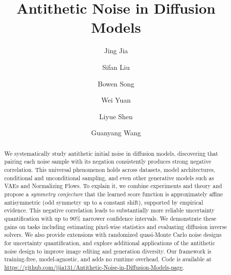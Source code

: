\documentclass[12pt]{article}
\newcommand{\0}{\mathbf{0}}
\begin{document}
\title{Antithetic Noise in Diffusion Models}
\author[1]{Jing Jia}
\author[2]{Sifan Liu \protect\footnotemark[1]}
\author[3]{Bowen Song}
\author[4]{Wei Yuan}   
\author[3]{Liyue Shen \protect\footnotemark[1]}
\author[4]{Guanyang Wang \protect\footnotemark[1]}


\maketitle

\begingroup
  \makeatletter
    \renewcommand*{\thefootnote}{\fnsymbol{footnote}}
    \setcounter{footnote}{1}
  \makeatother
\endgroup
\begin{abstract}
We systematically study antithetic initial noise in diffusion models, discovering that pairing each noise sample with its negation consistently produces strong negative correlation. This universal phenomenon holds across datasets, model architectures, conditional and unconditional sampling, and even other generative models such as VAEs and Normalizing Flows. To explain it, we combine experiments and theory and propose a \textit{symmetry conjecture} that the learned score function is approximately affine antisymmetric (odd symmetry up to a constant shift), supported by empirical evidence.
This negative correlation leads to substantially more reliable uncertainty quantification with up to $90\%$ narrower confidence intervals.  We demonstrate these gains on tasks including estimating pixel-wise statistics and evaluating diffusion inverse solvers.  We also provide extensions with randomized quasi-Monte Carlo noise designs for uncertainty quantification, and explore additional applications of the antithetic noise design to improve image editing and generation diversity. Our framework is training-free, model-agnostic, and adds no runtime overhead. Code is available at \url{https://github.com/jjia131/Antithetic-Noise-in-Diffusion-Models-page}.

\end{abstract}
\end{document}
